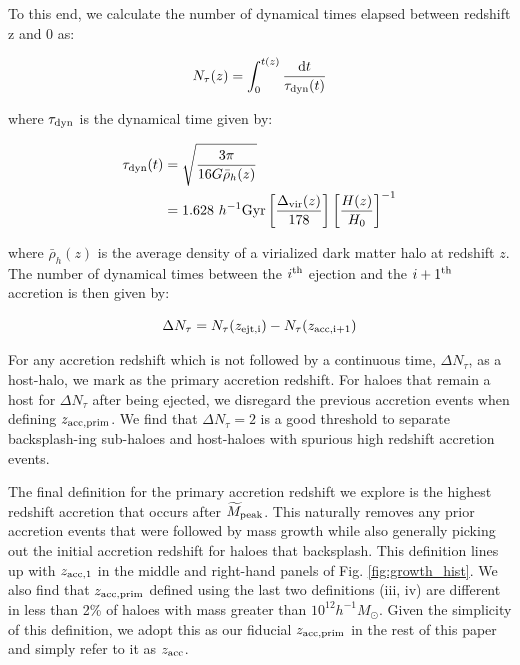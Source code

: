 \documentclass[a4paper,fleqn,usenatbib]{mnras}
\begin{document}
To this end, we calculate the number of dynamical times elapsed between redshift z and 0 as:
%
\begin{linenomath}
\begin{equation}
N_{\tau}(z) = \int_0^{t(z)} \frac{\mathrm{d}t}{\tau_{\rm dyn}(t)}
\label{eq:t_dyn}
\end{equation}
\end{linenomath}
%
where $\tau_{\rm dyn}$ is the dynamical time given by:
%
\begin{linenomath}
\begin{align}
\tau_{\rm dyn}(t) &= \sqrt{\frac{3\pi}{16G\bar{\rho}_h(z)}} \\ \nonumber
                           &=1.628 ~h^{-1}{\rm Gyr}\left[ \frac{\Delta_{\rm vir}(z)}{178} \right] \left[ \frac{H(z)}{H_0}\right]^{-1}
\end{align}
\end{linenomath}
%
where $\bar{\rho}_h(z)$ is the average density of a virialized dark matter halo at redshift $z$.  The number of dynamical times between the $i^{\rm th}$ ejection and the $i+1^{\rm th}$ accretion is then given by:
%
\begin{linenomath}
\begin{equation}
 \Delta N_{\tau} = N_{\tau}(z_{\rm ejt, i}) - N_{\tau}(z_{\rm acc, i+1})
 \end{equation}
 \end{linenomath}
%
For any accretion redshift which is not followed by a continuous time, $\Delta N_{\tau}$, as a host-halo, we mark as the primary accretion redshift.  For haloes that remain a host for $\Delta N_{\tau}$ after being ejected, we disregard the previous accretion events when defining $z_{\rm acc, prim}$.  We find that $\Delta N_{\tau} = 2$ is a good threshold to separate backsplash-ing sub-haloes and host-haloes with spurious high redshift accretion events.  

The final definition for the primary accretion redshift we explore is the highest redshift accretion that occurs after $\widetilde{M}_{\rm peak}$.  This naturally removes any prior accretion events that were followed by mass growth while also generally picking out the initial accretion redshift for haloes that backsplash.  This definition lines up with $z_{\rm acc, 1}$ in the middle and right-hand panels of Fig. \ref{fig:growth_hist}.  We also find that $z_{\rm acc, prim}$ defined using the last two definitions (iii, iv) are different in less than 2\% of haloes with mass greater than $10^{12}h^{-1}M_{\odot}$.  Given the simplicity of this definition, we adopt this as our fiducial $z_{\rm acc, prim}$ in the rest of this paper and simply refer to it as $z_{\rm acc}$. 
\end{document}
